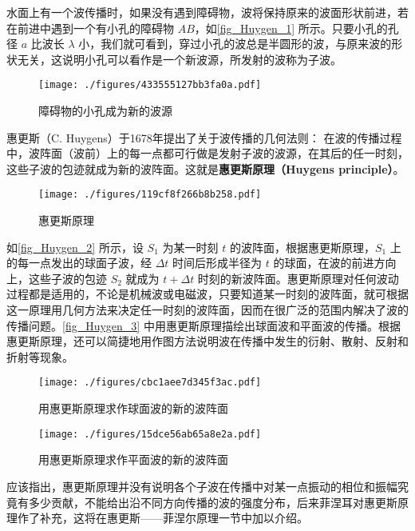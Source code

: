 
水面上有一个波传播时，如果没有遇到障碍物，波将保持原来的波面形状前进，若在前进中遇到一个有小孔的障碍物 $AB$，如\autoref{fig_Huygen_1} 所示。只要小孔的孔径 $a $ 比波长 $\lambda$ 小，我们就可看到，穿过小孔的波总是半圆形的波，与原来波的形状无关，这说明小孔可以看作是一个新波源，所发射的波称为子波。

\begin{figure}[ht]
\centering
\texttt{[image: ./figures/433555127bb3fa0a.pdf]}
\caption{障碍物的小孔成为新的波源} \label{fig_Huygen_1}
\end{figure}

惠更斯（C. Huygens）于1678年提出了关于波传播的几何法则： 在波的传播过程中，波阵面（波前）上的每一点都可行做是发射子波的波源，在其后的任一时刻，这些子波的包迹就成为新的波阵面。这就是\textbf{惠更斯原理（Huygens principle）}。
\begin{figure}[ht]
\centering
\texttt{[image: ./figures/119cf8f266b8b258.pdf]}
\caption{惠更斯原理} \label{fig_Huygen_2}
\end{figure}

如\autoref{fig_Huygen_2} 所示，设 $S_1$ 为某一时刻 $t $ 的波阵面，根据惠更斯原理，$S_1$ 上的每一点发出的球面子波，经 $\Delta t$ 时间后形成半径为 $t$ 的球面，在波的前进方向上，这些子波的包迹 $S_2$ 就成为 $t+\Delta t$ 时刻的新波阵面。惠更斯原理对任何波动过程都是适用的，不论是机械波或电磁波，只要知道某一时刻的波阵面，就可根据这一原理用几何方法来决定任一时刻的波阵面，因而在很广泛的范围内解决了波的传播问题。\autoref{fig_Huygen_3} 中用惠更斯原理描绘出球面波和平面波的传播。根据惠更斯原理，还可以简捷地用作图方法说明波在传播中发生的衍射、散射、反射和折射等现象。
\begin{figure}[ht]
\centering
\texttt{[image: ./figures/cbc1aee7d345f3ac.pdf]}
\caption{用惠更斯原理求作球面波的新的波阵面} \label{fig_Huygen_3}
\end{figure}
\begin{figure}[ht]
\centering
\texttt{[image: ./figures/15dce56ab65a8e2a.pdf]}
\caption{用惠更斯原理求作平面波的新的波阵面} \label{fig_Huygen_4}
\end{figure}
应该指出，惠更斯原理并没有说明各个子波在传播中对某一点振动的相位和振幅究竟有多少贡献，不能给出沿不同方向传播的波的强度分布，后来菲涅耳对惠更斯原理作了补充，这将在惠更斯——菲涅尔原理一节中加以介绍。
